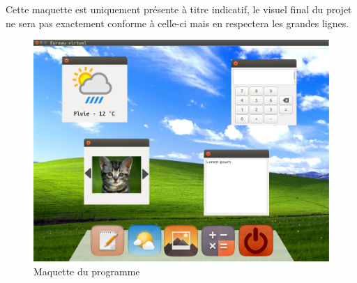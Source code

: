 Cette maquette est uniquement présente à titre indicatif, le visuel final du projet ne sera pas exactement conforme à celle-ci mais en respectera les grandes lignes.

\begin{figure}[H]
	\centering
	\includegraphics[scale=0.4]{images/maquette.jpg}
	\caption{Maquette du programme}
\end{figure}
